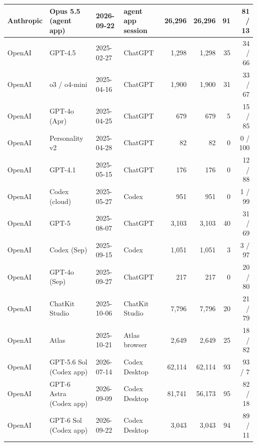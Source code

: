 \documentclass[11pt]{article}
\begin{document}
\begin{table}[h]
{\begin{tabular}{llllrrrr}
Anthropic & Opus 5.5 (agent app) & 2026-09-22 & agent app session & 26{,}296 & 26{,}296 & 91 & 81 / 13 \\
\midrule
OpenAI & GPT-4.5 & 2025-02-27 & ChatGPT & 1{,}298 & 1{,}298 & 35 & 34 / 66 \\
OpenAI & o3 / o4-mini & 2025-04-16 & ChatGPT & 1{,}900 & 1{,}900 & 31 & 33 / 67 \\
OpenAI & GPT-4o (Apr) & 2025-04-25 & ChatGPT & 679 & 679 & 5 & 15 / 85 \\
OpenAI & Personality v2 & 2025-04-28 & ChatGPT & 82 & 82 & 0 & 0 / 100 \\
OpenAI & GPT-4.1 & 2025-05-15 & ChatGPT & 176 & 176 & 0 & 12 / 88 \\
OpenAI & Codex (cloud) & 2025-05-27 & Codex & 951 & 951 & 0 & 1 / 99 \\
OpenAI & GPT-5 & 2025-08-07 & ChatGPT & 3{,}103 & 3{,}103 & 40 & 31 / 69 \\
OpenAI & Codex (Sep) & 2025-09-15 & Codex & 1{,}051 & 1{,}051 & 3 & 3 / 97 \\
OpenAI & GPT-4o (Sep) & 2025-09-27 & ChatGPT & 217 & 217 & 0 & 20 / 80 \\
OpenAI & ChatKit Studio & 2025-10-06 & ChatKit Studio & 7{,}796 & 7{,}796 & 20 & 21 / 79 \\
OpenAI & Atlas & 2025-10-21 & Atlas browser & 2{,}649 & 2{,}649 & 25 & 18 / 82 \\
OpenAI & GPT-5.6 Sol (Codex app) & 2026-07-14 & Codex Desktop & 62{,}114 & 62{,}114 & 93 & 93 / 7 \\
OpenAI & GPT-6 Astra (Codex app) & 2026-09-09 & Codex Desktop & 81{,}741 & 56{,}173 & 95 & 82 / 18 \\
OpenAI & GPT-6 Sol (Codex app) & 2026-09-22 & Codex Desktop & 3{,}043 & 3{,}043 & 94 & 89 / 11 \\
\bottomrule
\end{tabular}}
\end{table}
\end{document}
